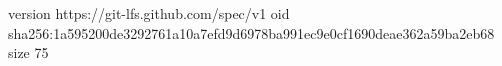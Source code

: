 version https://git-lfs.github.com/spec/v1
oid sha256:1a595200de3292761a10a7efd9d6978ba991ec9e0cf1690deae362a59ba2eb68
size 75
